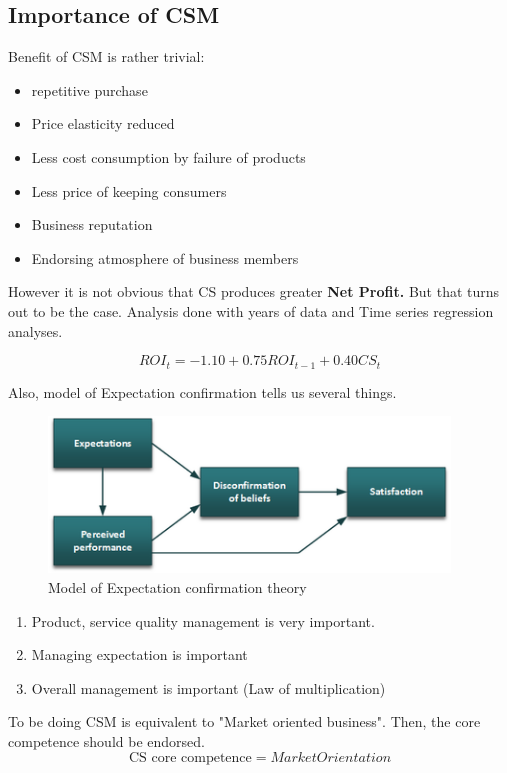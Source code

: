 \documentclass[12pt]{article}
\newcommand{\tb}{\textbf}
\begin{document}
\subsection{Importance of CSM}

Benefit of CSM is rather trivial:
\begin{itemize}
	\item repetitive purchase
	\item Price elasticity reduced
	\item Less cost consumption by failure of products
	\item Less price of keeping consumers
	\item Business reputation
	\item Endorsing atmosphere of business members
\end{itemize}

However it is not obvious that CS produces greater \tb{Net Profit.} But that turns out to be the case.
Analysis done with years of data and Time series regression analyses.

\[
ROI_t = -1.10 + 0.75ROI_{t-1} +0.40CS_t
\]

Also, model of Expectation confirmation tells us several things.

\begin{figure}[H]
	\centering
	\includegraphics[width=0.95\textwidth]{img/exp.png}
	\caption{Model of Expectation confirmation theory}
	\label{}
\end{figure}

\begin{enumerate}
	\item Product, service quality management is very important.
	\item Managing expectation is important
	\item Overall management is important (Law of multiplication)
\end{enumerate}

To be doing CSM is equivalent to "Market oriented business". Then, the core competence should be endorsed.
\[
\text{CS core competence} = Market Orientation
\]
\end{document}
